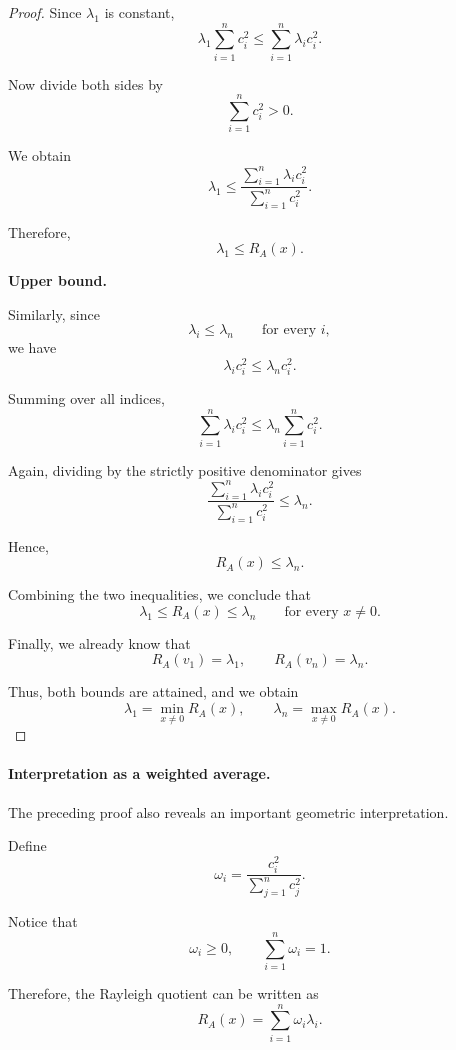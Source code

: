\documentclass[14pt,letterpaper]{article}
\theoremstyle{plain}
\theoremstyle{definition}
\theoremstyle{remark}
\begin{document}
\begin{proof}
Since $\lambda_1$ is constant,
\[
\lambda_1\sum_{i=1}^{n}c_i^2
\leq
\sum_{i=1}^{n}\lambda_i c_i^2.
\]

Now divide both sides by
\[
\sum_{i=1}^{n}c_i^2>0.
\]

We obtain
\[
\lambda_1
\leq
\frac{
\displaystyle\sum_{i=1}^{n}\lambda_i c_i^2
}{
\displaystyle\sum_{i=1}^{n}c_i^2
}.
\]

Therefore,
\[
\boxed{
\lambda_1\leq R_A(x).
}
\]

\medskip

\noindent
\textbf{Upper bound.}

Similarly, since
\[
\lambda_i\leq\lambda_n
\qquad
\text{for every }i,
\]
we have
\[
\lambda_i c_i^2
\leq
\lambda_n c_i^2.
\]

Summing over all indices,
\[
\sum_{i=1}^{n}\lambda_i c_i^2
\leq
\lambda_n\sum_{i=1}^{n}c_i^2.
\]

Again, dividing by the strictly
positive denominator gives
\[
\frac{
\displaystyle\sum_{i=1}^{n}\lambda_i c_i^2
}{
\displaystyle\sum_{i=1}^{n}c_i^2
}
\leq
\lambda_n.
\]

Hence,
\[
\boxed{
R_A(x)\leq\lambda_n.
}
\]

Combining the two inequalities,
we conclude that
\[
\boxed{
\lambda_1
\leq
R_A(x)
\leq
\lambda_n
\qquad
\text{for every }x\neq0.
}
\]

Finally, we already know that
\[
R_A(v_1)=\lambda_1,
\qquad
R_A(v_n)=\lambda_n.
\]

Thus, both bounds are attained,
and we obtain
\[
\boxed{
\lambda_1=\min_{x\neq0}R_A(x),
\qquad
\lambda_n=\max_{x\neq0}R_A(x).
}
\]

\end{proof}


\paragraph{Interpretation as a weighted average.}

The preceding proof also reveals
an important geometric interpretation.

Define
\[
\omega_i
=
\frac{c_i^2}{
\displaystyle\sum_{j=1}^{n}c_j^2
}.
\]

Notice that
\[
\omega_i\geq0,
\qquad
\sum_{i=1}^{n}\omega_i=1.
\]

Therefore, the Rayleigh quotient
can be written as
\[
\boxed{
R_A(x)=\sum_{i=1}^{n}\omega_i\lambda_i.
}
\]
\end{document}
